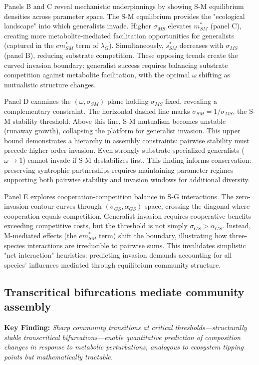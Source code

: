 \documentclass[9pt,twocolumn]{pnas-new}
\begin{document}
Panels B and C reveal mechanistic underpinnings by showing S-M equilibrium densities across parameter space. The S-M equilibrium provides the "ecological landscape" into which generalists invade. Higher $\sigma_{MS}$ elevates $m^*_{SM}$ (panel C), creating more metabolite-mediated facilitation opportunities for generalists (captured in the $e m^*_{SM}$ term of $\lambda_G$). Simultaneously, $s^*_{SM}$ decreases with $\sigma_{MS}$ (panel B), reducing substrate competition. These opposing trends create the curved invasion boundary: generalist success requires balancing substrate competition against metabolite facilitation, with the optimal $\omega$ shifting as mutualistic structure changes.

Panel D examines the $(\omega, \sigma_{SM})$ plane holding $\sigma_{MS}$ fixed, revealing a complementary constraint. The horizontal dashed line marks $\sigma_{SM} = 1/\sigma_{MS}$, the S-M stability threshold. Above this line, S-M mutualism becomes unstable (runaway growth), collapsing the platform for generalist invasion. This upper bound demonstrates a hierarchy in assembly constraints: pairwise stability must precede higher-order invasion. Even strongly substrate-specialized generalists ($\omega \to 1$) cannot invade if S-M destabilizes first. This finding informs conservation: preserving syntrophic partnerships requires maintaining parameter regimes supporting both pairwise stability and invasion windows for additional diversity.

Panel E explores cooperation-competition balance in S-G interactions. The zero-invasion contour curves through $(\sigma_{GS}, \alpha_{GS})$ space, crossing the diagonal where cooperation equals competition. Generalist invasion requires cooperative benefits exceeding competitive costs, but the threshold is not simply $\sigma_{GS} > \alpha_{GS}$. Instead, M-mediated effects (the $e m^*_{SM}$ term) shift the boundary, illustrating how three-species interactions are irreducible to pairwise sums. This invalidates simplistic "net interaction" heuristics: predicting invasion demands accounting for all species' influences mediated through equilibrium community structure.

\subsection*{Transcritical bifurcations mediate community assembly}

\textbf{Key Finding:} \textit{Sharp community transitions at critical thresholds—structurally stable transcritical bifurcations—enable quantitative prediction of composition changes in response to metabolic perturbations, analogous to ecosystem tipping points but mathematically tractable.}
\end{document}
